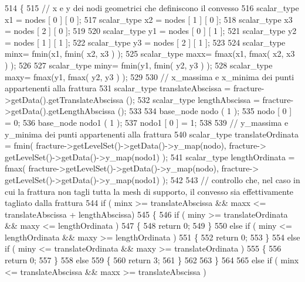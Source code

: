 \begin{DoxyCode}
514 \{
515     \textcolor{comment}{// x e y dei nodi geometrici che definiscono il convesso}
516     scalar\_type x1 = nodes [ 0 ] [ 0 ];
517     scalar\_type x2 = nodes [ 1 ] [ 0 ];
518     scalar\_type x3 = nodes [ 2 ] [ 0 ];
519 
520     scalar\_type y1 = nodes [ 0 ] [ 1 ];
521     scalar\_type y2 = nodes [ 1 ] [ 1 ];
522     scalar\_type y3 = nodes [ 2 ] [ 1 ];
523 
524     scalar\_type minx= fmin(x1, fmin( x2, x3 ) );
525     scalar\_type maxx= fmax(x1, fmax( x2, x3 ) );
526 
527     scalar\_type miny= fmin(y1, fmin( y2, y3 ) );
528     scalar\_type maxy= fmax(y1, fmax( y2, y3 ) );
529 
530     \textcolor{comment}{// x\_massima e x\_minima dei punti appartenenti alla frattura}
531     scalar\_type translateAbscissa = fracture->getData().getTranslateAbscissa ();
532     scalar\_type lengthAbscissa = fracture->getData().getLengthAbscissa ();
533 
534     base\_node nodo ( 1 );
535     nodo [ 0 ] = 0;
536     base\_node nodo1 ( 1 );
537     nodo1 [ 0 ] = 1;
538 
539     \textcolor{comment}{// y\_massima e y\_minima dei punti appartenenti alla frattura}
540     scalar\_type translateOrdinata = fmin( fracture->getLevelSet()->getData()->y\_map(nodo), fracture->
      getLevelSet()->getData()->y\_map(nodo1) );
541     scalar\_type lengthOrdinata = fmax( fracture->getLevelSet()->getData()->y\_map(nodo), fracture->
      getLevelSet()->getData()->y\_map(nodo1) );
542 
543     \textcolor{comment}{// controllo che, nel caso in cui la frattura non tagli tutta la mesh di supporto, il convesso sia
       effettivamente tagliato dalla frattura}
544     \textcolor{keywordflow}{if} ( minx >= translateAbscissa && maxx <= translateAbscissa + lengthAbscissa)
545     \{   
546         \textcolor{keywordflow}{if} ( miny >= translateOrdinata && maxy <= lengthOrdinata )
547         \{   
548             \textcolor{keywordflow}{return} 0;
549         \}
550         \textcolor{keywordflow}{else} \textcolor{keywordflow}{if} ( miny <= lengthOrdinata && maxy >= lengthOrdinata )
551         \{   
552             \textcolor{keywordflow}{return} 0;
553         \}
554         \textcolor{keywordflow}{else} \textcolor{keywordflow}{if} ( miny <= translateOrdinata && maxy >= translateOrdinata )
555         \{   
556             \textcolor{keywordflow}{return} 0;
557         \}
558         \textcolor{keywordflow}{else}
559         \{   
560             \textcolor{keywordflow}{return} 3;
561         \}
562 
563     \}
564 
565     \textcolor{keywordflow}{else} \textcolor{keywordflow}{if} ( minx <= translateAbscissa && maxx >= translateAbscissa )

\end{DoxyCode}
